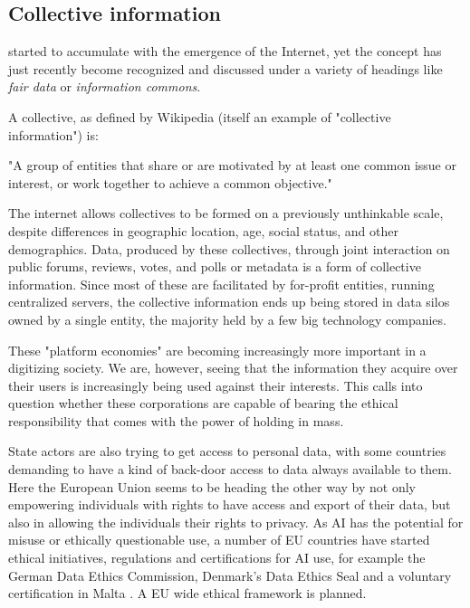 \subsection{Collective information \statusgreen}\label{sec:collective_information}

 started to accumulate with the emergence of the Internet, yet the concept has just recently become recognized and discussed under a variety of headings like \emph{fair data} or \emph{information commons}.

A collective, as defined by Wikipedia (itself an example of "collective information") is:
\begin{displayquote}
"A group of entities that share or are motivated by at least one common issue or interest, or work together to achieve a common objective." 
\end{displayquote}
The internet allows collectives to be formed on a previously unthinkable scale, despite differences in geographic location, age, social status, and other demographics. Data,  produced by these collectives, through joint interaction on public forums, reviews, votes, and polls or metadata is a form of collective information. Since most of these are facilitated by for-profit entities, running centralized servers, the collective information ends up being stored in data silos owned by a single entity, the majority held by a few big technology companies.

These "platform economies" are becoming increasingly more important in a digitizing society. We are, however, seeing that the information they acquire over their users is increasingly being used against their interests. This calls into question whether these corporations are capable of bearing the ethical responsibility that comes with the power of holding  in mass.

State actors are also trying to get access to personal data, with some countries demanding to have a kind of back-door access to data always available to them. Here the European Union seems to be heading the other way by not only empowering individuals with rights to have access and export of their data, but also in allowing the individuals their rights to privacy. 
As AI has the potential for misuse or ethically questionable use, a number of EU countries have started ethical initiatives, regulations and certifications for AI use, for example the German Data Ethics Commission, Denmark's Data Ethics Seal and a voluntary certification in Malta \cite{EUWhitePaperAI2020Feb}. A EU wide ethical framework is planned. 


